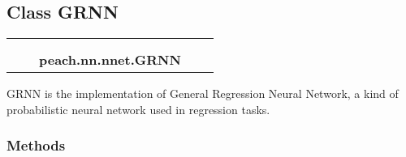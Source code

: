 
\subsection{Class GRNN}

    \label{peach:nn:nnet:GRNN}
\begin{tabular}{cccccc}
\multicolumn{2}{r}{\settowidth{\BCL}{object}\multirow{2}{\BCL}{object}}
&&
  \\\cline{3-3}
  &&\multicolumn{1}{c|}{}
&&
  \\
&&\multicolumn{2}{l}{\textbf{peach.nn.nnet.GRNN}}
\end{tabular}


GRNN is the implementation of General Regression Neural Network, a kind of
probabilistic neural network used in regression tasks.


  \subsubsection{Methods}

    \vspace{0.5ex}

